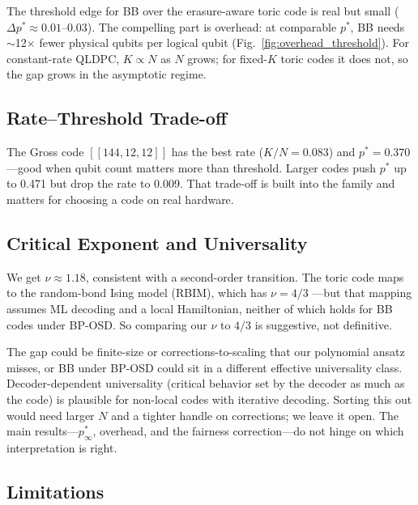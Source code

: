 \documentclass[twocolumn,10pt]{article}
\begin{document}
The threshold edge for BB over the erasure-aware toric code is real but small
($\Delta p^* \approx 0.01$--$0.03$).
The compelling part is overhead: at comparable $p^*$, BB needs $\sim$12$\times$ fewer
physical qubits per logical qubit (Fig.~\ref{fig:overhead_threshold}).
For constant-rate QLDPC, $K \propto N$ as $N$ grows; for fixed-$K$ toric codes it does
not, so the gap grows in the asymptotic regime.

\subsection{Rate--Threshold Trade-off}

The Gross code $[[144,12,12]]$ has the best rate ($K/N = 0.083$) and $p^* = 0.370$---good
when qubit count matters more than threshold.
Larger codes push $p^*$ up to 0.471 but drop the rate to 0.009.
That trade-off is built into the family and matters for choosing a code on real hardware.

\subsection{Critical Exponent and Universality}\label{sec:critical_exponent}

We get $\nu \approx 1.18$, consistent with a second-order transition.
The toric code maps to the random-bond Ising model (RBIM), which has $\nu = 4/3$
\cite{dennis2002topological, wang2003quantum}---but that mapping assumes ML decoding and a
local Hamiltonian, neither of which holds for BB codes under BP-OSD.
So comparing our $\nu$ to $4/3$ is suggestive, not definitive.

The gap could be finite-size or corrections-to-scaling that our polynomial ansatz misses, or
BB under BP-OSD could sit in a different effective universality class.
Decoder-dependent universality (critical behavior set by the decoder as much as the code) is
plausible for non-local codes with iterative decoding.
Sorting this out would need larger $N$ and a tighter handle on corrections; we leave it
open.
The main results---$p^*_\infty$, overhead, and the fairness correction---do not hinge on
which interpretation is right.

\subsection{Limitations}\label{sec:limitations}
\end{document}
